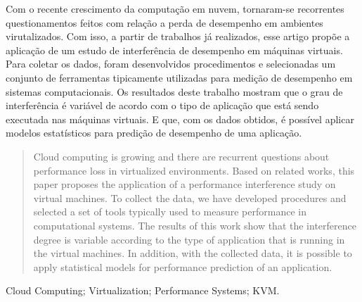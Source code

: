 \begin{resumo}
Com o recente crescimento da computação em nuvem, tornaram-se recorrentes questionamentos feitos com relação a perda de desempenho em ambientes virutalizados. Com isso, a partir de trabalhos já realizados, esse artigo propõe a aplicação de um estudo de interferência de desempenho em máquinas virtuais. Para coletar os dados, foram desenvolvidos procedimentos e selecionadas um conjunto de  ferramentas tipicamente utilizadas para medição de desempenho em sistemas computacionais. Os resultados deste trabalho mostram que o grau de interferência é variável de acordo com o tipo de aplicação que está sendo executada nas máquinas virtuais. E que, com os dados obtidos, é possível aplicar modelos estatísticos para predição de desempenho de uma aplicação.
\end{resumo}

\begin{abstract}
Cloud computing is growing and there are recurrent questions about performance loss in virtualized environments. Based on related works, this paper proposes the application of a performance interference study on virtual machines. To collect the data, we have developed procedures and selected a set of tools typically used to measure performance in computational systems. The results of this work show that the interference degree is variable according to the type of application that is running in the virtual machines. In addition, with the collected data, it is possible to apply statistical models for performance prediction of an application.
\end{abstract}

\begin{IEEEkeywords}
Cloud Computing; Virtualization; Performance Systems; KVM.
\end{IEEEkeywords}
